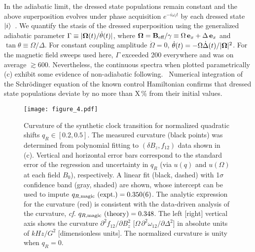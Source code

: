\documentclass[aps,prl,reprint,superscriptaddress,floatfix]{revtex4-1}
\begin{document}
In the adiabatic limit, the dressed state populations remain constant and the above superposition evolves under phase acquisition $e^{-i \omega_i t}$ by each dressed state $\vert i \rangle $~\cite{messiah_quantum_1962}. 
We quantify the stasis of the dressed superposition using the generalized adiabatic parameter $\Gamma \equiv \vert \mathbf{\Omega}(t)/\dot{\theta}(t) \vert $, where $\mathbf{\Omega} = \mathbf{B}_{\text{eff}} / \gamma \equiv \Omega \, \mathbf{e}_x + \Delta \, \mathbf{e}_x$ and $\tan \theta \equiv \Omega / \Delta$.
For constant coupling amplitude $\dot{\Omega} = 0$, $\dot{\theta}(t) = -\Omega \dot{\Delta}(t)/\vert \mathbf{\Omega} \vert ^2$.
For the magnetic field sweeps used here, $\Gamma$ exceeded 200 everywhere and was on average $\gtrsim 600$.
Nevertheless, the continuous spectra when plotted parametrically (c) exhibit some evidence of non-adiabatic following.~
Numerical integration of the Schr\"{o}dinger equation of the known control Hamiltonian confirms that dressed state populations deviate by no more than X\,\% from their initial values.
\begin{figure}
    \texttt{[image: figure\_4.pdf]}
    \caption{
    \label{fig:curvature_vs_qR}
        Curvature of the synthetic clock transition for normalized quadratic shifts $q_R \in [0.2, 0.5]$.
        The measured curvature (black points) was determined from polynomial fitting to $(\delta B_z, f_{12})$ data shown in (c).
        Vertical and horizontal error bars correspond to the standard error of the regression and uncertainty in $q_R$ (via $u(q)$ and $u(\Omega)$ at each field $B_0$), respectively.
        A linear fit (black, dashed) with 1$\sigma$ confidence band (gray, shaded) are shown, whose intercept can be used to impute $q_{R,\text{magic}}\text{ (expt.)} = 0.350(6)$.
        The analytic expression for the curvature (red) is consistent with the data-driven analysis of the curvature, \textit{cf.} $q_{R,\text{magic}}\text{ (theory)} = 0.348$.
        The left [right] vertical axis shows the curvature $\partial^2 f_{12}/\partial B_z^2$ [$\Omega\, \partial^2\omega_{12}/\partial \Delta^2$] in absolute units of $\unit{kHz/G^2}$ [dimensionless units].
        The normalized curvature is unity when $q_R=0$.
    }
\end{figure}
\end{document}
